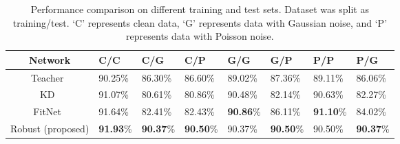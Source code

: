 \documentclass[journal]{IEEEtran}
\begin{document}
\begin{table*}[htb]
\setlength{\abovecaptionskip}{0.2cm}
\setlength{\belowcaptionskip}{0.2cm}
\renewcommand\arraystretch{1}
\centering
\small
\caption{Performance comparison on different training and test sets. Dataset was split as training/test. `C' represents clean data, `G' represents data with Gaussian noise, and `P' represents data with Poisson noise.}
\begin{tabular}{|c|*{7}{p{1.15cm}<{\centering}|}}
\hline
\textbf{Network}  &  \textbf{C/C}  &  \textbf{C/G}  &  \textbf{C/P}  &  \textbf{G/G}  &  \textbf{G/P}  &  \textbf{P/P} &  \textbf{P/G}   \\
\hline
Teacher~\cite{goodfellow2013maxout}  & 90.25\%  & 86.30\%  & 86.60\%  & 89.02\%  & 87.36\%  & 89.11\%  & 86.06\% \\
\hline
KD~\cite{hinton2015distilling}     & 91.07\%  & 80.61\%  & 80.86\%  & 90.48\%  & 82.14\%  & 90.63\%  &  82.27\% \\
\hline
FitNet~\cite{romero2014fitnets}  & 91.64\%  & 82.41\%  & 82.43\%  & \textbf{90.86}\%  & 86.11\%  & \textbf{91.10}\%  & 84.02\%  \\
\hline
\hline
Robust (proposed)  & \textbf{91.93}\%  & \textbf{90.37}\%  & \textbf{90.50}\%  & 90.37\%  &  \textbf{90.50}\%  & 90.50\%  & \textbf{90.37}\%  \\
\hline
\end{tabular}
\label{tab_CGP}
\end{table*}
\end{document}
